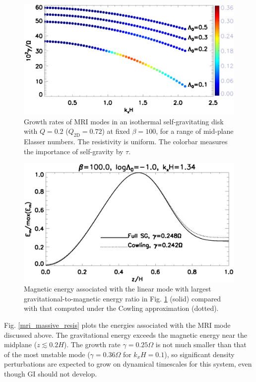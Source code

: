 \begin{figure}
  \includegraphics[width=\linewidth]{figures/compare_energy_resis}
  \caption{
    Growth rates of MRI modes in an isothermal self-gravitating
    disk with $Q=0.2$ ($Q_\mathrm{2D}=0.72$) at fixed $\beta=100$, 
    for a range of mid-plane Elasser numbers. The resistivity is
    uniform. The colorbar measures the importance of self-gravity by $\tau$. 
    \label{gravity_energy_resis}}
\end{figure}


\begin{figure}
  \includegraphics[width=\linewidth]{figures/compare_result_cowling}
  \caption{Magnetic energy associated with the linear mode with
    largest gravitational-to-magnetic energy ratio in
    Fig. \ref{gravity_energy_resis} (solid) compared with that computed
    under the Cowling approximation (dotted). %
    \label{mri_massive_cowling}}
\end{figure}

Fig. \ref{mri_massive_resis} plots the energies associated with the 
MRI mode discussed above. 
The gravitational energy exceeds the 
magnetic energy near the midplane ($z\lesssim0.2H$). The growth rate $\gamma=0.25\Omega$
is not much smaller than that of the most unstable mode
($\gamma=0.36\Omega$ for $k_xH=0.1$), so significant density
perturbations are expected to grow on dynamical timescales for this
system, even though GI should not develop. 

